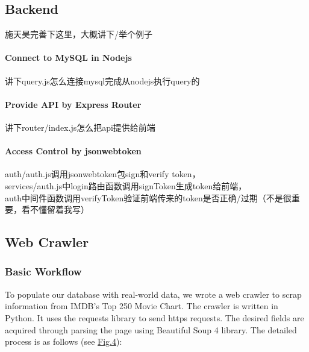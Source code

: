 \begin{CJK*}{UTF8}{gbsn}
\subsection{Backend}
施天昊完善下这里，大概讲下/举个例子
\paragraph{Connect to MySQL in Nodejs}
讲下query.js怎么连接mysql完成从nodejs执行query的
\paragraph{Provide API by Express Router}
讲下router/index.js怎么把api提供给前端
\paragraph{Access Control by jsonwebtoken}
auth/auth.js调用jsonwebtoken包sign和verify token，\\
services/auth.js中login路由函数调用signToken生成token给前端，\\
auth中间件函数调用verifyToken验证前端传来的token是否正确/过期（不是很重要，看不懂留着我写）

\subsection{Web Crawler}
\subsubsection{Basic Workflow}
To populate our database with real-world data, we wrote a web crawler to scrap information from IMDB's Top 250 Movie Chart. The crawler is written in Python. It uses the requests library to send https requests. The desired fields are acquired through parsing the page using Beautiful Soup 4 library.
The detailed process is as follows (see \hyperref[crawler]{Fig.4}):\par


\end{CJK*}
